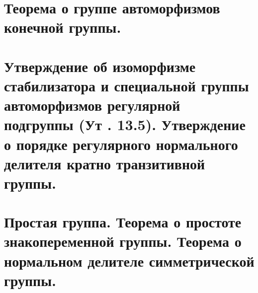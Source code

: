 \documentclass[a4paper,11pt,openany]{book}
\begin{document}
\section{Теорема о группе автоморфизмов конечной группы.}
\section{Утверждение об изоморфизме стабилизатора и специальной группы автоморфизмов регулярной подгруппы (Ут . 13.5). Утверждение о порядке регулярного нормального делителя кратно транзитивной группы.}
\section{Простая группа. Теорема о простоте знакопеременной группы. Теорема о нормальном делителе симметрической группы.}
\end{document}
